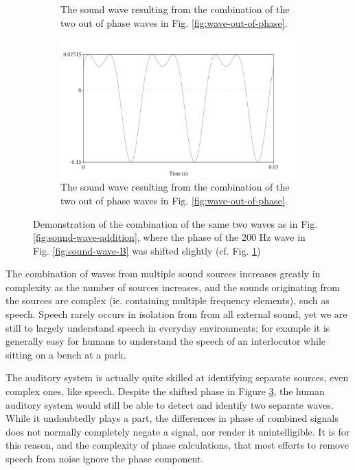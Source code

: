 \begin{figure}[h!]
\begin{subfigure}{0.5\textwidth}
  \caption{The sound wave resulting from the combination of the two out of phase waves in Fig. \ref{fig:wave-out-of-phase}.}
  \label{fig:wave-addition-200hz-shifted}
\end{subfigure}
%
\begin{center}
\begin{subfigure}{0.5\textwidth}
  \includegraphics[width=\textwidth]{figure/sound-combined-shifted-phase.png}
  \caption{The sound wave resulting from the combination of the two out of phase waves in Fig. \ref{fig:wave-out-of-phase}.}
  \label{fig:sound-combined-shifted-phase}
\end{subfigure}
\end{center}
\caption{Demonstration of the combination of the same two waves as in Fig. \ref{fig:sound-wave-addition}, where the phase of the 200 Hz wave in Fig. \ref{fig:sound-wave-B} was shifted slightly (cf. Fig. \ref{fig:wave-addition-200hz-shifted})}
\label{fig:sound-shifted-phase}
\end{figure}

The combination of waves from multiple sound sources increases greatly in complexity as the number of sources increases, and the sounds originating from the sources are complex (ie. containing multiple frequency elements), such as speech.  Speech rarely occurs in isolation from from all external sound, yet we are still to largely understand speech in everyday environments; for example it is generally easy for humans to understand the speech of an interlocutor while sitting on a bench at a park.

The auditory system is actually quite skilled at identifying separate sources, even complex ones, like speech. Despite the shifted phase in Figure \ref{fig:sound-shifted-phase}, the human auditory system would still be able to detect and identify two separate waves.  While it undoubtedly plays a part, the differences in phase of combined signals does not normally completely negate a signal, nor render it unintelligible.  It is for this reason, and the complexity of phase calculations, that most efforts to remove speech from noise ignore the phase component.

